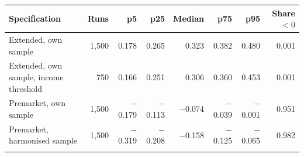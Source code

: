 \setlength{\tabcolsep}{3pt}
\begin{tabular}{@{}lrrrrrrr@{}}
\toprule
Specification & Runs & p5 & p25 & Median & p75 & p95 & Share $<0$\\
\midrule
Extended, own sample & 1,500 & 0.178 & 0.265 & 0.323 & 0.382 & 0.480 & 0.001\\
Extended, own sample, income threshold & 750 & 0.166 & 0.251 & 0.306 & 0.360 & 0.453 & 0.001\\
Premarket, own sample & 1,500 & $-$0.179 & $-$0.113 & $-$0.074 & $-$0.039 & $-$0.001 & 0.951\\
Premarket, harmonised sample & 1,500 & $-$0.319 & $-$0.208 & $-$0.158 & $-$0.125 & $-$0.065 & 0.982\\
\botrule
\end{tabular}
